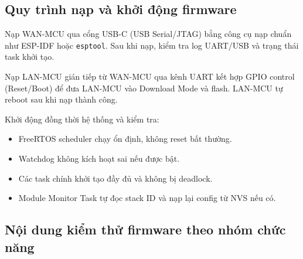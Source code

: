     \subsection{Quy trình nạp và khởi động firmware}
    
        Nạp WAN-MCU qua cổng USB-C (USB Serial/JTAG) bằng công cụ nạp chuẩn như ESP-IDF hoặc \texttt{esptool}. Sau khi nạp, kiểm tra log UART/USB và trạng thái task khởi tạo.
        
        Nạp LAN-MCU gián tiếp từ WAN-MCU qua kênh UART kết hợp GPIO control (Reset/Boot) để đưa LAN-MCU vào Download Mode và flash. LAN-MCU tự reboot sau khi nạp thành công.
        
        Khởi động đồng thời hệ thống và kiểm tra:
        \begin{itemize}
            \item FreeRTOS scheduler chạy ổn định, không reset bất thường.
            \item Watchdog không kích hoạt sai nếu được bật.
            \item Các task chính khởi tạo đầy đủ và không bị deadlock.
            \item Module Monitor Task tự đọc stack ID và nạp lại config từ NVS nếu có.
        \end{itemize}
        
    \subsection{Nội dung kiểm thử firmware theo nhóm chức năng}
    
